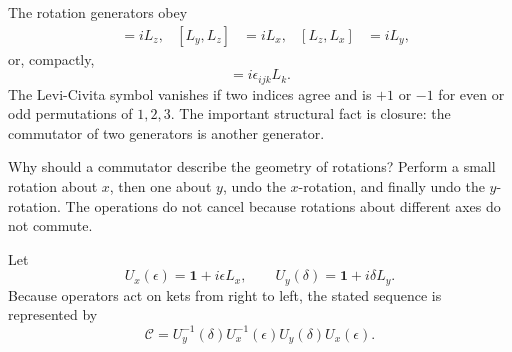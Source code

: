 The rotation generators obey
\begin{align}
[L_x,L_y]&=iL_z,&
[L_y,L_z]&=iL_x,&
[L_z,L_x]&=iL_y,
\end{align}
or, compactly,
\begin{equation}
[L_i,L_j]=i\epsilon_{ijk}L_k.
\end{equation}
The Levi-Civita symbol vanishes if two indices agree and is \(+1\) or \(-1\) for even or odd permutations of \(1,2,3\). The important structural fact is closure: the commutator of two generators is another generator.

Why should a commutator describe the geometry of rotations? Perform a small rotation about \(x\), then one about \(y\), undo the \(x\)-rotation, and finally undo the \(y\)-rotation. The operations do not cancel because rotations about different axes do not commute.

\begin{classroomqa}
\end{classroomqa}

Let
\begin{equation}
U_x(\epsilon)=\mathbf 1+i\epsilon L_x,
\qquad
U_y(\delta)=\mathbf 1+i\delta L_y.
\end{equation}
Because operators act on kets from right to left, the stated sequence is represented by
\begin{equation}
\mathcal C
=U_y^{-1}(\delta)U_x^{-1}(\epsilon)
 U_y(\delta)U_x(\epsilon).
\end{equation}

\begin{classroomqa}
\end{classroomqa}

